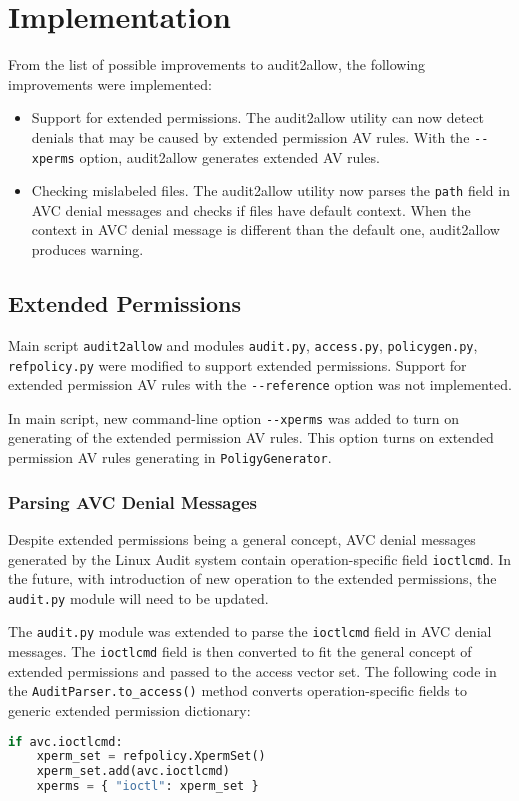 \chapter{Implementation}
From the list of possible improvements to audit2allow, the following
improvements were implemented:
\begin{itemize}
    \item Support for extended permissions. The audit2allow utility can now
        detect denials that may be caused by extended permission AV rules. With
        the \texttt{-{}-xperms} option, audit2allow generates extended AV rules.
    \item Checking mislabeled files. The audit2allow utility now parses the
        \texttt{path} field in AVC denial messages and checks if files have
        default context. When the context in AVC denial message is different
        than the default one, audit2allow produces warning.
\end{itemize}

\section{Extended Permissions}
\label{xpermsimp}
Main script \texttt{audit2allow} and modules \texttt{audit.py},
\texttt{access.py}, \texttt{policygen.py}, \texttt{refpolicy.py} were modified
to support extended permissions. Support for extended permission AV rules with
the \texttt{-{}-reference} option was not implemented.

In main script, new command-line option \texttt{-{}-xperms} was added to turn on
generating of the extended permission AV rules. This option turns on extended
permission AV rules generating in \texttt{PoligyGenerator}.

\subsection{Parsing AVC Denial Messages}
Despite extended permissions being a general concept, AVC denial messages
generated by the Linux Audit system contain operation-specific field
\texttt{ioctlcmd}. In the future, with introduction of new operation to the
extended permissions, the \texttt{audit.py} module will need to be updated.

The \texttt{audit.py} module was extended to parse the \texttt{ioctlcmd} field
in AVC denial messages. The \texttt{ioctlcmd} field is then converted to fit the
general concept of extended permissions and passed to the access vector set. The
following code in the \texttt{AuditParser.to\_access()} method converts
operation-specific fields to generic extended permission dictionary:
\begin{lstlisting}[language=Python]
if avc.ioctlcmd:
    xperm_set = refpolicy.XpermSet()
    xperm_set.add(avc.ioctlcmd)
    xperms = { "ioctl": xperm_set }
\end{lstlisting}

